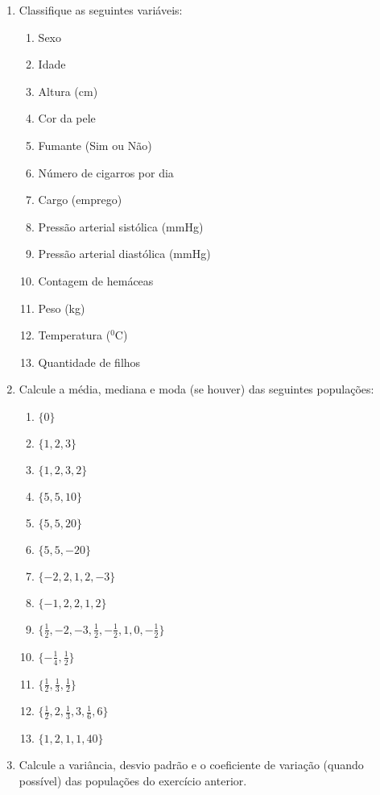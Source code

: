 \documentclass[a4paper]{article}
\begin{document}
\begin{enumerate}
\item Classifique as seguintes variáveis:
  \begin{enumerate}
  \item Sexo
  \item Idade
  \item Altura (cm)
  \item Cor da pele
  \item Fumante (Sim ou Não)
  \item Número de cigarros por dia
  \item Cargo (emprego)
  \item Pressão arterial sistólica (mmHg)
  \item Pressão arterial diastólica (mmHg)
  \item Contagem de hemáceas
  \item Peso (kg)
  \item Temperatura ($^0$C)
  \item Quantidade de filhos
  \end{enumerate}

\item Calcule a média, mediana e moda (se houver) das seguintes populações:

  \begin{enumerate}
  \item $\{0\}$
  \item $\{1,2,3\}$
  \item $\{1,2,3,2\}$
  \item $\{5,5,10\}$
  \item $\{5,5,20\}$
  \item $\{5,5,-20\}$
  \item $\{-2,2,1,2,-3\}$
  \item $\{-1,2,2,1,2\}$
  \item $\{\frac{1}{2},-2,-3,\frac{1}{2},-\frac{1}{2},1,0,-\frac{1}{2}\}$
  \item $\{-\frac{1}{4},\frac{1}{2}\}$
  \item $\{\frac{1}{2},\frac{1}{3},\frac{1}{2}\}$
  \item $\{\frac{1}{2},2,\frac{1}{3},3,\frac{1}{6},6\}$
  \item $\{1,2,1,1,40\}$
  \end{enumerate}

\item Calcule a variância, desvio padrão e o coeficiente de variação
  (quando possível) das populações do exercício anterior.


\end{enumerate}
\end{document}
